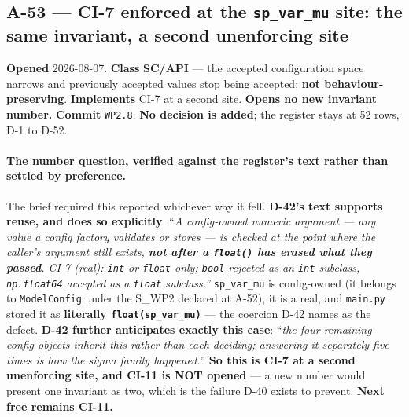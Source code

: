 \documentclass[
  10pt,
]{article}
\begin{document}
\hypertarget{a-53}{%
\subsection{A-53 --- CI-7 enforced at the \texttt{sp\_var\_mu} site: the same invariant, a second unenforcing site}\label{a-53}}

\textbf{Opened} 2026-08-07. \textbf{Class} \textbf{SC/API} --- the accepted configuration space narrows and previously accepted values stop being accepted; \textbf{not behaviour-preserving}. \textbf{Implements} CI-7 at a second site. \textbf{Opens no new invariant number.} \textbf{Commit} \texttt{WP2.8}. \textbf{No decision is added}; the register stays at 52 rows, D-1 to D-52.

\paragraph{The number question, verified against the register's text rather than settled by preference.}
The brief required this reported whichever way it fell. \textbf{D-42's text supports reuse, and does so explicitly}: ``\emph{A config-owned numeric argument --- any value a config factory validates or stores --- is checked at the point where the caller's argument still exists, \textbf{not after a \texttt{float()} has erased what they passed}. CI-7 (real): \texttt{int} or \texttt{float} only; \texttt{bool} rejected as an \texttt{int} subclass, \texttt{np.float64} accepted as a \texttt{float} subclass.''} \texttt{sp\_var\_mu} is config-owned (it belongs to \texttt{ModelConfig} under the S\_WP2 declared at A-52), it is a real, and \texttt{main.py} stored it as \textbf{literally \texttt{float(sp\_var\_mu)}} --- the coercion D-42 names as the defect. \textbf{D-42 further anticipates exactly this case}: ``\emph{the four remaining config objects inherit this rather than each deciding; answering it separately five times is how the sigma family happened.}'' \textbf{So this is CI-7 at a second unenforcing site, and CI-11 is NOT opened} --- a new number would present one invariant as two, which is the failure D-40 exists to prevent. \textbf{Next free remains CI-11.}
\end{document}
